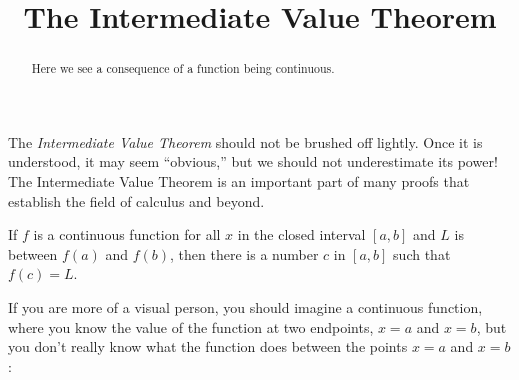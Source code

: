 \documentclass{ximera}
\title{The Intermediate Value Theorem}
\begin{document}
\begin{abstract}
  Here we see a consequence of a function being continuous.
\end{abstract}
\maketitle



The \textit{Intermediate Value Theorem} should not be brushed off
lightly. Once it is understood, it may seem ``obvious,'' but
we should not underestimate its power! The Intermediate Value Theorem is an important part of many proofs that establish the field of calculus and beyond.

\begin{theorem}\label{theorem:IVT}
	If $f$ is a continuous function for all $x$ in the closed interval
	$[a,b]$ and $L$ is between $f(a)$ and $f(b)$, then there is a number
	$c$ in $[a, b]$ such that $f(c) = L$.
\end{theorem}


If you are more of a visual person, you should imagine a continuous
function, where you know the value of the function at two endpoints,
$x=a$ and $x=b$, but you don't really know what the function does
between the points $x=a$ and $x=b$:
\end{document}
